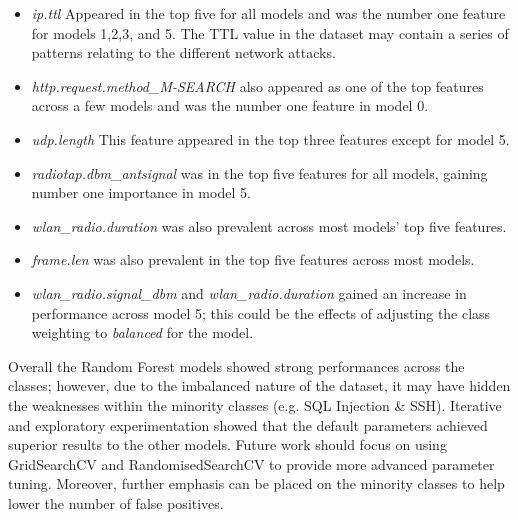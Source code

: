 \begin{itemize}
	\item \textit{ip.ttl} Appeared in the top five for all models and was the number one feature for models 1,2,3, and 5. The TTL value in the dataset may contain a series of patterns relating to the different network attacks.
	\item \textit{http.request.method\_M-SEARCH} also appeared as one of the top features across a few models and was the number one feature in model 0. 
	\item \textit{udp.length} This feature appeared in the top three features except for model 5.
  	\item \textit{radiotap.dbm\_antsignal} was in the top five features for all models, gaining number one importance in model 5.
	\item \textit{wlan\_radio.duration} was also prevalent across most models' top five features.
	\item \textit{frame.len} was also prevalent in the top five features across most models.
	\item \textit{wlan\_radio.signal\_dbm} and \textit{wlan\_radio.duration} gained an increase in performance across model 5; this could be the effects of adjusting the class weighting to \textit{balanced} for the model.
\end{itemize}

\medskip
Overall the Random Forest models showed strong performances across the classes; however, due to the imbalanced nature of the dataset, it may have hidden the weaknesses within the minority classes (e.g. SQL Injection \& SSH). Iterative and exploratory experimentation showed that the default parameters achieved superior results to the other models. Future work should focus on using GridSearchCV and RandomisedSearchCV to provide more advanced parameter tuning. Moreover, further emphasis can be placed on the minority classes to help lower the number of false positives.

